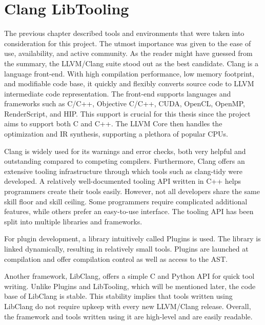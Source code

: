 \chapter{Clang LibTooling}


The previous chapter described tools and environments that were taken
into consideration for this project. 
The utmost importance was given to the ease of use, availability, and 
active community. 
As the reader might have guessed from the summary, the LLVM/Clang 
suite stood out as the best candidate.
Clang is a language front-end. With high compilation performance, 
low memory footprint, and modifiable code base, it quickly and flexibly 
converts source code to LLVM intermediate code representation. 
The front-end supports languages and frameworks such as C/C++, 
Objective C/C++, CUDA, OpenCL, OpenMP, RenderScript, and HIP. 
This support is crucial for this thesis since the project 
aims to support both C and C++. 
The LLVM Core then handles the optimization and IR synthesis, 
supporting a plethora of popular CPUs.

Clang is widely used for its warnings and error checks, both very 
helpful and outstanding compared to competing compilers. 
Furthermore, Clang offers an extensive tooling infrastructure 
through which tools such as clang-tidy were developed. 
A relatively well-documented tooling API written in C++ helps 
programmers create their tools easily. 
However, not all developers share the same skill floor and skill ceiling. 
Some programmers require complicated additional features, while others 
prefer an easy-to-use interface. 
The tooling API has been split into multiple libraries and frameworks. 

For plugin development, a library intuitively called Plugins is used. 
The library is linked dynamically, resulting in relatively small tools. 
Plugins are launched at compilation and offer compilation control 
as well as access to the AST. 

Another framework, LibClang, offers a simple C and Python API for quick 
tool writing. 
Unlike Plugins and LibTooling, which will be mentioned later, the code 
base of LibClang is stable. 
This stability implies that tools written using LibClang do not require
upkeep with every new LLVM/Clang release. 
Overall, the framework and tools written using it are high-level and 
are easily readable.

